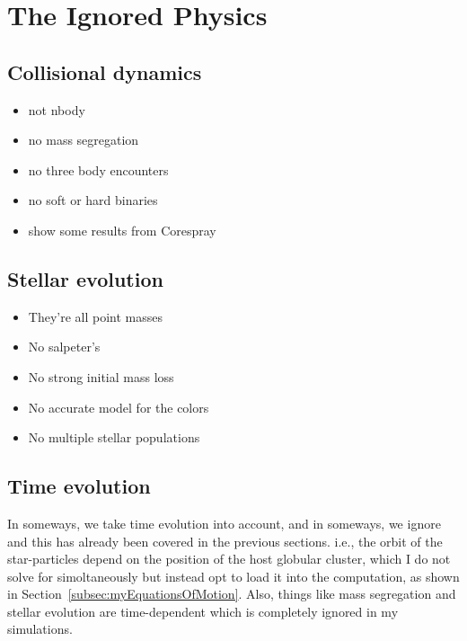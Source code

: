      



\section{The Ignored Physics}
    \subsection{Collisional dynamics}
        \begin{itemize}
            \item not nbody
            \item no mass segregation
            \item no three body encounters 
            \item no soft or hard binaries 
            \item show some results from Corespray 
        \end{itemize}
    
    \subsection{Stellar evolution}
        \begin{itemize}
            \item They're all point masses 
            \item No salpeter's 
            \item No strong initial mass loss 
            \item No accurate model for the colors 
            \item No multiple stellar populations 
        \end{itemize}
    
    \subsection{Time evolution}
        In someways, we take time evolution into account, and in someways, we ignore and this has already been covered in the previous sections. i.e., the orbit of the star-particles depend on the position of the host globular cluster, which I do not solve for simoltaneously but instead opt to load it into the computation, as shown in Section~\ref{subsec:myEquationsOfMotion}. Also, things like mass segregation and stellar evolution are time-dependent which is completely ignored in my simulations. 

